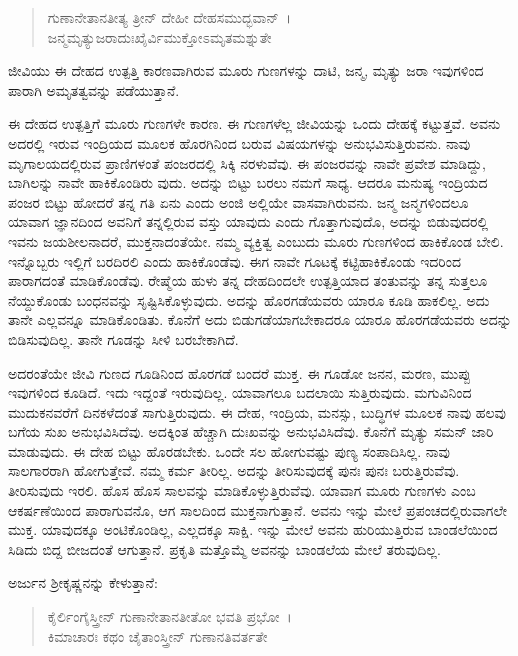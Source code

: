 \begin{verse}
ಗುಣಾನೇತಾನತೀತ್ಯ ತ್ರೀನ್ ದೇಹೀ ದೇಹಸಮುದ್ಭವಾನ್~।\\ಜನ್ಮಮೃತ್ಯುಜರಾದುಃಖೈರ್ವಿಮುಕ್ತೋಽಮೃತಮಶ್ನುತೇ 
\end{verse}

{\small ಜೀವಿಯು ಈ ದೇಹದ ಉತ್ಪತ್ತಿ ಕಾರಣವಾಗಿರುವ ಮೂರು ಗುಣಗಳನ್ನು ದಾಟಿ, ಜನ್ಮ, ಮೃತ್ಯು ಜರಾ ಇವುಗಳಿಂದ ಪಾರಾಗಿ ಅಮೃತತ್ವವನ್ನು ಪಡೆಯುತ್ತಾನೆ.}

ಈ ದೇಹದ ಉತ್ಪತ್ತಿಗೆ ಮೂರು ಗುಣಗಳೇ ಕಾರಣ. ಈ ಗುಣಗಳೆಲ್ಲ ಜೀವಿಯನ್ನು ಒಂದು ದೇಹಕ್ಕೆ ಕಟ್ಟುತ್ತವೆ. ಅವನು ಅದರಲ್ಲಿ ಇರುವ ಇಂದ್ರಿಯದ ಮೂಲಕ ಹೊರಗಿನಿಂದ ಬರುವ ವಿಷಯಗಳನ್ನು ಅನುಭವಿಸುತ್ತಿರುವನು. ನಾವು ಮೃಗಾಲಯದಲ್ಲಿರುವ ಪ್ರಾಣಿಗಳಂತೆ ಪಂಜರದಲ್ಲಿ ಸಿಕ್ಕಿ ನರಳುವೆವು. ಈ ಪಂಜರವನ್ನು ನಾವೇ ಪ್ರವೇಶ ಮಾಡಿದ್ದು, ಬಾಗಿಲನ್ನು ನಾವೇ ಹಾಕಿಕೊಂಡಿರು ವುದು. ಅದನ್ನು ಬಿಟ್ಟು ಬರಲು ನಮಗೆ ಸಾಧ್ಯ. ಆದರೂ ಮನುಷ್ಯ ಇಂದ್ರಿಯದ ಪಂಜರ ಬಿಟ್ಟು ಹೋದರೆ ತನ್ನ ಗತಿ ಏನು ಎಂದು ಅಂಜಿ ಅಲ್ಲಿಯೇ ವಾಸವಾಗಿರುವನು. ಜನ್ಮ ಜನ್ಮಗಳಿಂದಲೂ ಯಾವಾಗ ಜ್ಞಾನದಿಂದ ಅವನಿಗೆ ತನ್ನಲ್ಲಿರುವ ವಸ್ತು ಯಾವುದು ಎಂದು ಗೊತ್ತಾಗುವುದೊ, ಅದನ್ನು ಬಿಡುವುದರಲ್ಲಿ ಇವನು ಜಯಶೀಲನಾದರೆ, ಮುಕ್ತನಾದಂತೆಯೇ. ನಮ್ಮ ವ್ಯಕ್ತಿತ್ವ ಎಂಬುದು ಮೂರು ಗುಣಗಳಿಂದ ಹಾಕಿಕೊಂಡ ಬೇಲಿ. ಇನ್ನೊಬ್ಬರು ಇಲ್ಲಿಗೆ ಬರದಿರಲಿ ಎಂದು ಹಾಕಿಕೊಂಡೆವು. ಈಗ ನಾವೇ ಗೂಟಕ್ಕೆ ಕಟ್ಟಿಹಾಕಿಕೊಂಡು ಇದರಿಂದ ಪಾರಾಗದಂತೆ ಮಾಡಿಕೊಂಡೆವು. ರೇಷ್ಮೆಯ ಹುಳು ತನ್ನ ದೇಹದಿಂದಲೇ ಉತ್ಪತ್ತಿಯಾದ ತಂತುವನ್ನು ತನ್ನ ಸುತ್ತಲೂ ನೆಯ್ದುಕೊಂಡು ಬಂಧನವನ್ನು ಸೃಷ್ಟಿಸಿಕೊಳ್ಳುವುದು. ಅದನ್ನು ಹೊರಗಡೆಯವರು ಯಾರೂ ಕೂಡಿ ಹಾಕಲಿಲ್ಲ. ಅದು ತಾನೇ ಎಲ್ಲವನ್ನೂ ಮಾಡಿಕೊಂಡಿತು. ಕೊನೆಗೆ ಅದು ಬಿಡುಗಡೆಯಾಗಬೇಕಾದರೂ ಯಾರೂ ಹೊರಗಡೆಯವರು ಅದನ್ನು ಬಿಡಿಸುವುದಿಲ್ಲ. ತಾನೇ ಗೂಡನ್ನು ಸೀಳಿ ಬರಬೇಕಾಗಿದೆ.

ಅದರಂತೆಯೇ ಜೀವಿ ಗುಣದ ಗೂಡಿನಿಂದ ಹೊರಗಡೆ ಬಂದರೆ ಮುಕ್ತ. ಈ ಗೂಡೋ ಜನನ, ಮರಣ, ಮುಪ್ಪು ಇವುಗಳಿಂದ ಕೂಡಿದೆ. ಇದು ಇದ್ದಂತೆ ಇರುವುದಿಲ್ಲ. ಯಾವಾಗಲೂ ಬದಲಾಯಿ ಸುತ್ತಿರುವುದು. ಮಗುವಿನಿಂದ ಮುದುಕನವರೆಗೆ ದಿನಕಳೆದಂತೆ ಸಾಗುತ್ತಿರುವುದು. ಈ ದೇಹ, ಇಂದ್ರಿಯ, ಮನಸ್ಸು, ಬುದ್ಧಿಗಳ ಮೂಲಕ ನಾವು ಹಲವು ಬಗೆಯ ಸುಖ ಅನುಭವಿಸಿದೆವು. ಅದಕ್ಕಿಂತ ಹೆಚ್ಚಾಗಿ ದುಃಖವನ್ನು ಅನುಭವಿಸಿದೆವು. ಕೊನೆಗೆ ಮೃತ್ಯು ಸಮನ್ ಜಾರಿ ಮಾಡುವುದು. ಈ ದೇಹ ಬಿಟ್ಟು ಹೊರಡಬೇಕು. ಒಂದೇ ಸಲ ಹೋಗುವಷ್ಟು ಪುಣ್ಯ ಸಂಪಾದಿಸಿಲ್ಲ. ನಾವು ಸಾಲಗಾರರಾಗಿ ಹೋಗುತ್ತೇವೆ. ನಮ್ಮ ಕರ್ಮ ತೀರಿಲ್ಲ. ಅದನ್ನು ತೀರಿಸುವುದಕ್ಕೆ ಪುನಃ ಪುನಃ ಬರುತ್ತಿರುವೆವು. ತೀರಿಸುವುದು ಇರಲಿ. ಹೊಸ ಹೊಸ ಸಾಲವನ್ನು ಮಾಡಿಕೊಳ್ಳುತ್ತಿರುವೆವು. ಯಾವಾಗ ಮೂರು ಗುಣಗಳು ಎಂಬ ಆಕರ್ಷಣೆಯಿಂದ ಪಾರಾಗುವನೊ, ಆಗ ಸಾಲದಿಂದ ಮುಕ್ತನಾಗುತ್ತಾನೆ. ಅವನು ಇನ್ನು ಮೇಲೆ ಪ್ರಪಂಚದಲ್ಲಿರುವಾಗಲೇ ಮುಕ್ತ. ಯಾವುದಕ್ಕೂ ಅಂಟಿಕೊಂಡಿಲ್ಲ, ಎಲ್ಲದಕ್ಕೂ ಸಾಕ್ಷಿ. ಇನ್ನು ಮೇಲೆ ಅವನು ಹುರಿಯುತ್ತಿರುವ ಬಾಂಡಲೆಯಿಂದ ಸಿಡಿದು ಬಿದ್ದ ಬೀಜದಂತೆ ಆಗುತ್ತಾನೆ. ಪ್ರಕೃತಿ ಮತ್ತೊಮ್ಮೆ ಅವನನ್ನು ಬಾಂಡಲೆಯ ಮೇಲೆ ತರುವುದಿಲ್ಲ.

ಅರ್ಜುನ ಶ‍್ರೀಕೃಷ್ಣನನ್ನು ಕೇಳುತ್ತಾನೆ:

\begin{verse}
ಕೈರ್ಲಿಂಗೈಸ್ತ್ರೀನ್ ಗುಣಾನೇತಾನತೀತೋ ಭವತಿ ಪ್ರಭೋ~।\\ಕಿಮಾಚಾರಃ ಕಥಂ ಚೈತಾಂಸ್ತ್ರೀನ್ ಗುಣಾನತಿವರ್ತತೇ 
\end{verse}

